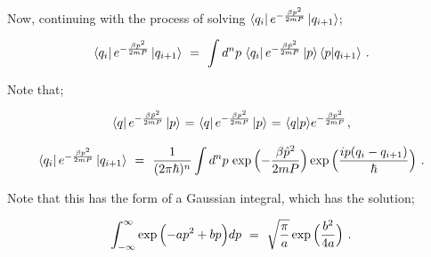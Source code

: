 \documentclass{article}
\begin{document}
Now, continuing with the process of solving \begin{math} \bra{q_i} e^{ - \frac{ \beta p^2}{2 m P}} \ket{q_{i+1}} \end{math}; 

\begin{equation} \label{eb-eq-1-201}
\bra{q_i} e^{ - \frac{ \beta p^2}{2 m P}} \ket{q_{i+1}} \hspace{0.125cm} = \hspace{0.125cm} \int d^n p \hspace{0.05cm} \bra{q_i} e^{ - \frac{ \beta \hat{p}^2}{2 m P}} \ket{p} \langle p | q_{i+1} \rangle \hspace{0.125cm} .
\end{equation}

Note that;

\begin{equation} \label{eb-eq-1-202}
\bra{q} e^{ - \frac{ \beta \hat{p}^2}{2 m P}} \ket{p} \hspace{0.025cm} = \hspace{0.025cm} \bra{q} e^{ - \frac{ \beta p^2}{2 m P}} \ket{p} \hspace{0.025cm} = \hspace{0.025cm} \langle q | p \rangle e^{ - \frac{ \beta p^2}{2 m P}} \hspace{0.025cm} ,
\end{equation}

\begin{equation} \label{eb-eq-1-203}
\bra{q_i} e^{ - \frac{ \beta p^2}{2 m P}} \ket{q_{i+1}} \hspace{0.125cm} = \hspace{0.125cm} \frac{1}{(2 \pi \hbar)^{n}} \int d^n p \hspace{0.05cm} \exp\Big({ - \frac{ \beta \hat{p}^2}{2 m P}}\Big)  \exp\Big({\frac{i p (q_i - q_{i+1})}{\hbar}}\Big)  \hspace{0.125cm} .
\end{equation}

Note that this has the form of a Gaussian integral, which has the solution; 

\begin{equation} \label{eb-eq-1-204}
\int_{- \infty}^{\infty} \exp\Big({ -a p^2 + b p}\Big) dp \hspace{0.125cm} = \hspace{0.125cm} \sqrt{\frac{\pi}{a}} \exp\Big({\frac{b^2}{4 a}}\Big) \hspace{0.125cm} .
\end{equation}
\end{document}
